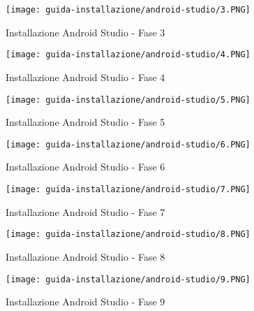 \begin{figure}[htbp]
    \texttt{[image: guida-installazione/android-studio/3.PNG]}
    \centering
    \caption{Installazione Android Studio - Fase 3}
    \label{fig:installazione3}
\end{figure}

\begin{figure}[htbp]
    \texttt{[image: guida-installazione/android-studio/4.PNG]}
    \centering
    \caption{Installazione Android Studio - Fase 4}
    \label{fig:installazione4}
\end{figure}

\begin{figure}[htbp]
    \texttt{[image: guida-installazione/android-studio/5.PNG]}
    \centering
    \caption{Installazione Android Studio - Fase 5}
    \label{fig:installazione5}
\end{figure}

\begin{figure}[htbp]
    \texttt{[image: guida-installazione/android-studio/6.PNG]}
    \centering
    \caption{Installazione Android Studio - Fase 6}
    \label{fig:installazione6}
\end{figure}

\begin{figure}[htbp]
    \texttt{[image: guida-installazione/android-studio/7.PNG]}
    \centering
    \caption{Installazione Android Studio - Fase 7}
    \label{fig:installazione7}
\end{figure}

\begin{figure}[htbp]
    \texttt{[image: guida-installazione/android-studio/8.PNG]}
    \centering
    \caption{Installazione Android Studio - Fase 8}
    \label{fig:installazione8}
\end{figure}

\begin{figure}[htbp]
    \texttt{[image: guida-installazione/android-studio/9.PNG]}
    \centering
    \caption{Installazione Android Studio - Fase 9}
    \label{fig:installazione9}
\end{figure}

\clearpage

